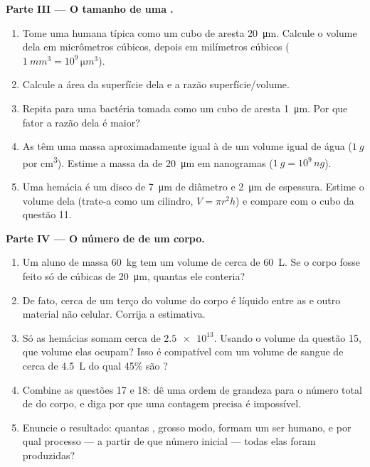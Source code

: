 \begin{problem}
\medskip
\noindent\textbf{Parte III --- O tamanho de uma .}
\begin{enumerate}[resume]
  \item Tome uma  humana típica como um cubo de aresta
        \qty{20}{\micro m}. Calcule o volume dela em micrômetros
        cúbicos, depois em milímetros cúbicos
        ($\qty{1}{mm^3} = 10^9\,\unit{\micro m^3}$).
  \item Calcule a área da superfície dela e a razão superfície/volume.
  \item Repita para uma bactéria tomada como um cubo de aresta
        \qty{1}{\micro m}. Por que fator a razão dela é maior?
  \item As  têm uma massa aproximadamente igual à de um volume
        igual de água ($\qty{1}{g}$ por \unit{cm^3}). Estime a massa da
         de \qty{20}{\micro m} em nanogramas
        ($\qty{1}{g} = 10^9\,\unit{ng}$).
  \item Uma hemácia é um disco de \qty{7}{\micro m} de diâmetro e
        \qty{2}{\micro m} de espessura. Estime o volume dela (trate-a
        como um cilindro, $V = \pi r^2 h$) e compare com o cubo da
        questão 11.
\end{enumerate}

\medskip
\noindent\textbf{Parte IV --- O número de  de um corpo.}
\begin{enumerate}[resume]
  \item Um aluno de massa \qty{60}{kg} tem um volume de cerca de
        \qty{60}{L}. Se o corpo fosse feito só de  cúbicas de
        \qty{20}{\micro m}, quantas ele conteria?
  \item De fato, cerca de um terço do volume do corpo é líquido entre
        as  e outro material não celular. Corrija a estimativa.
  \item Só as hemácias somam cerca de $\num{2.5e13}$. Usando o volume
        da questão 15, que volume elas ocupam? Isso é compatível com um
        volume de sangue de cerca de \qty{4.5}{L} do qual 45\% são
        ?
  \item Combine as questões 17 e 18: dê uma ordem de grandeza para o
        número total de  do corpo, e diga por que uma contagem
        precisa é impossível.
  \item Enuncie o resultado: quantas , grosso modo, formam um
        ser humano, e por qual processo --- a partir de que número
        inicial --- todas elas foram produzidas?
\end{enumerate}
\end{problem}
